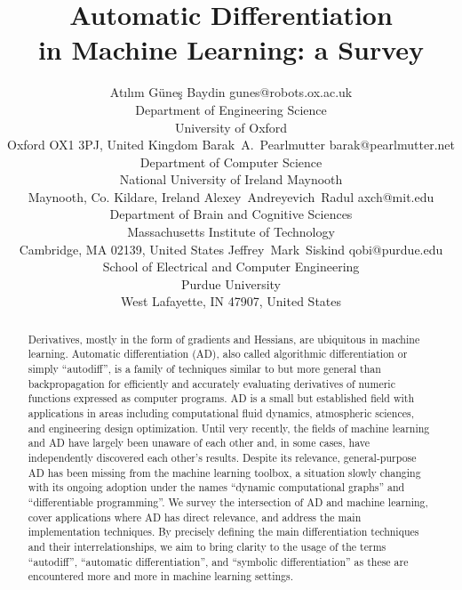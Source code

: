 \documentclass[twoside,11pt]{article}
\begin{document}
\title{Automatic Differentiation\\in Machine Learning: a Survey}

\author{\name Atılım Güneş Baydin \email gunes@robots.ox.ac.uk \\
       \addr Department of Engineering Science\\
       University of Oxford\\
       Oxford OX1 3PJ, United Kingdom
       \AND
       \name Barak~A.~Pearlmutter \email barak@pearlmutter.net \\
       \addr Department of Computer Science\\
       National University of Ireland Maynooth\\
       Maynooth, Co. Kildare, Ireland
       \AND
       \name Alexey~Andreyevich~Radul \email axch@mit.edu \\
       \addr Department of Brain and Cognitive Sciences\\
       Massachusetts Institute of Technology\\
       Cambridge, MA 02139, United States
       \AND
       \name Jeffrey~Mark~Siskind \email qobi@purdue.edu \\
       \addr School of Electrical and Computer Engineering\\
       Purdue University\\
       West Lafayette, IN 47907, United States}


\maketitle

\begin{abstract}%
Derivatives, mostly in the form of gradients and Hessians, are ubiquitous in machine learning. Automatic differentiation (AD), also called algorithmic differentiation or simply ``autodiff'', is a family of techniques similar to but more general than backpropagation for efficiently and accurately evaluating derivatives of numeric functions expressed as computer programs. AD is a small but established field with applications in areas including computational fluid dynamics, atmospheric sciences, and engineering design optimization. Until very recently, the fields of machine learning and AD have largely been unaware of each other and, in some cases, have independently discovered each other's results. Despite its relevance, general-purpose AD has been missing from the machine learning toolbox, a situation slowly changing with its ongoing adoption under the names ``dynamic computational graphs'' and ``differentiable programming''. We survey the intersection of AD and machine learning, cover applications where AD has direct relevance, and address the main implementation techniques. By precisely defining the main differentiation techniques and their interrelationships, we aim to bring clarity to the usage of the terms ``autodiff'', ``automatic differentiation'', and ``symbolic differentiation'' as these are encountered more and more in machine learning settings.

\end{abstract}
\end{document}
